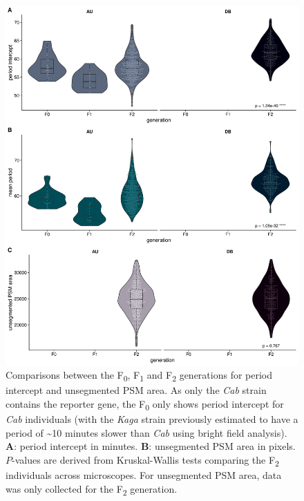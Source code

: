 \documentclass[
]{book}
\begin{document}
\begin{figure}
\includegraphics[width=1\linewidth]{figs/somites/phenotypes} \caption{Comparisons between the F\textsubscript{0}, F\textsubscript{1} and F\textsubscript{2} generations for period intercept and unsegmented PSM area. As only the \emph{Cab} strain contains the reporter gene, the F\textsubscript{0} only shows period intercept for \emph{Cab} individuals (with the \emph{Kaga} strain previously estimated to have a period of \textasciitilde10 minutes slower than \emph{Cab} using bright field analysis). \textbf{A}: period intercept in minutes. \textbf{B}: unsegmented PSM area in pixels. \(P\)-values are derived from Kruskal-Wallis tests comparing the F\textsubscript{2} individuals across microscopes. For unsegmented PSM area, data was only collected for the F\textsubscript{2} generation.}\label{fig:somite-phenos}
\end{figure}
\end{document}
